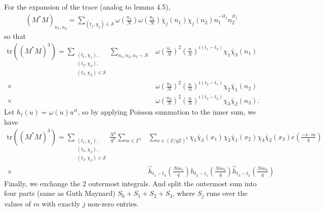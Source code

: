 For the expansion of the trace (analog to lemma 4.5), 
\begin{align*}
    (M^*M)_{n_1,n_2} = \sum_{(t_j,\chi_j)\in \mathcal{S}} \omega\left(\frac{n_1}{N}\right)\omega\left(\frac{n_2}{N}\right)
    \bar{\chi}_j(n_1)\chi_j(n_2)n_1^{-it_j}n_2^{it_j}
\end{align*}
so that \begin{align*}
    \textrm{tr}((M^*M)^3)=\sum_{\substack{(t_1,\chi_1),\\(t_2,\chi_2),\\(t_3,\chi_3)\in\mathcal{S}}}\sum_{n_1,n_2,n_3\sim N} & 
    \omega\left(\frac{n_1}{N}\right)^2 \left(\frac{n}{N}\right)^{i(t_1-t_3)}\chi_1\bar{\chi}_3(n_1)\\
    \times \ &\omega\left(\frac{n_2}{N}\right)^2 \left(\frac{n}{N}\right)^{i(t_2-t_1)}\chi_2\bar{\chi}_1(n_2)\\
    \times \ &\omega\left(\frac{n_3}{N}\right)^2 \left(\frac{n}{N}\right)^{i(t_3-t_2)}\chi_3\bar{\chi}_2(n_3).
\end{align*}
Let $h_t(u)=\omega(u)u^{it}$,
so by applying Poisson summation to the inner sum, we have \begin{align*}
    \textrm{tr}((M^*M)^3)=\sum_{\substack{(t_1,\chi_1),\\(t_2,\chi_2),\\(t_3,\chi_3)\in\mathcal{S}}}
    \frac{N^3}{q^3}\sum_{m\in\mathbb{Z}^3}&\sum_{x\in (\mathbb{Z}/q\mathbb{Z})^3}\chi_1\bar{\chi}_3(x_1)\chi_2\bar{\chi}_1(x_2)\chi_3\bar{\chi}_2(x_3) e\left(\frac{-x\cdot m}{q}\right)\\
    \times \ &\hat{h}_{t_1-t_3}\left(\frac{Nm_1}{q}\right)\hat{h}_{t_2-t_1}\left(\frac{Nm_2}{q}\right)\hat{h}_{t_3-t_2}\left(\frac{Nm_3}{q}\right) 
\end{align*}
Finally, we exchange the 2 outermost integrals. And split the outermost sum into four parts (same as Guth Maynard) $S_0+ S_1+S_2+S_3$,
where $S_j$ runs over the values of $m$ with exactly $j$ non-zero entries.
